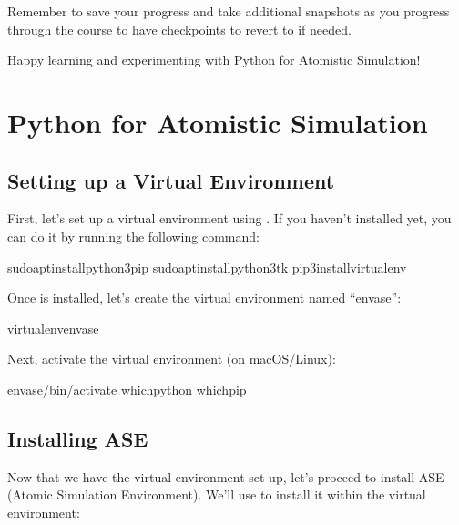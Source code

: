 \documentclass[letterpaper,10pt,english]{sphinxmanual}
\begin{document}
\sphinxAtStartPar
Remember to save your progress and take additional snapshots as you progress through the course to have checkpoints to revert to if needed.

\sphinxAtStartPar
Happy learning and experimenting with Python for Atomistic Simulation!

\sphinxstepscope


\chapter{Python for Atomistic Simulation}
\label{\detokenize{basics/basics:python-for-atomistic-simulation}}\label{\detokenize{basics/basics::doc}}

\section{Setting up a Virtual Environment}
\label{\detokenize{basics/basics:setting-up-a-virtual-environment}}
\sphinxAtStartPar
First, let’s set up a virtual environment using . If you haven’t installed  yet, you can do it by running the following command:

\begin{sphinxVerbatim}[commandchars=\\\{\}]
sudoaptinstallpython3\PYGZhy{}pip
sudoaptinstallpython3\PYGZhy{}tk
pip3installvirtualenv
\end{sphinxVerbatim}

\sphinxAtStartPar
Once  is installed, let’s create the virtual environment named “envase”:

\begin{sphinxVerbatim}[commandchars=\\\{\}]
virtualenvenvase
\end{sphinxVerbatim}

\sphinxAtStartPar
Next, activate the virtual environment (on macOS/Linux):

\begin{sphinxVerbatim}[commandchars=\\\{\}]
envase/bin/activate
whichpython
whichpip
\end{sphinxVerbatim}


\section{Installing ASE}
\label{\detokenize{basics/basics:installing-ase}}
\sphinxAtStartPar
Now that we have the virtual environment set up, let’s proceed to install ASE (Atomic Simulation Environment). We’ll use  to install it within the virtual environment:
\end{document}

